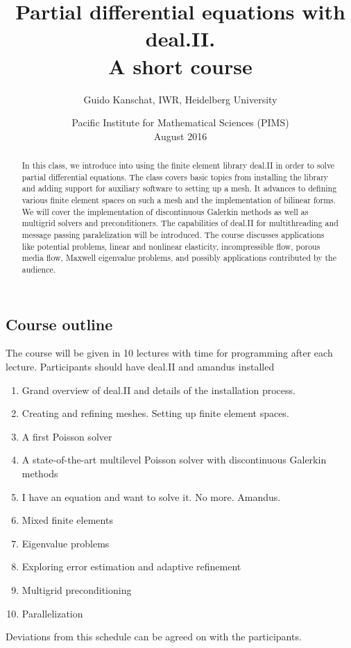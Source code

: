 \documentclass{article}
\begin{document}
\title{Partial differential equations with deal.II.\\A short course}
\author{Guido Kanschat, IWR, Heidelberg University}
\date{Pacific Institute for Mathematical Sciences (PIMS)\\August 2016}
\maketitle
\begin{abstract}
  In this class, we introduce into using the finite element library
  deal.II in order to solve partial differential equations. The class
  covers basic topics from installing the library and adding support
  for auxiliary software to setting up a mesh. It advances to defining
  various finite element spaces on such a mesh and the implementation
  of bilinear forms. We will cover the implementation of discontinuous
  Galerkin methods as well as multigrid solvers and
  preconditioners. The capabilities of deal.II for multithreading and
  message passing paralelization will be introduced.  The course
  discusses applications like potential problems, linear and nonlinear
  elasticity, incompressible flow, porous media flow, Maxwell
  eigenvalue problems, and possibly applications contributed by the
  audience.
\end{abstract}

\subsection*{Course outline}

The course will be given in 10 lectures with time for programming
after each lecture. Participants should have deal.II and amandus installed 

\begin{enumerate}
\item Grand overview of deal.II and details of the installation process.
\item Creating and refining meshes. Setting up finite element spaces.
\item A first Poisson solver
\item A state-of-the-art multilevel Poisson solver with discontinuous
  Galerkin methods
\item I have an equation and want to solve it. No more. Amandus.
\item Mixed finite elements
\item Eigenvalue problems
\item Exploring error estimation and adaptive refinement
\item Multigrid preconditioning
\item Parallelization
\end{enumerate}
Deviations from this schedule can be agreed on with the participants.
\end{document}
